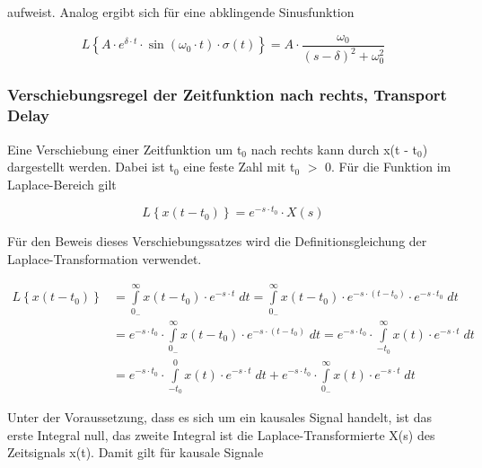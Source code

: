 \noindent aufweist. Analog ergibt sich für eine abklingende Sinusfunktion 

\begin{equation}\label{eq:fourthirtyfour}
L\left\{A\cdot e^{\delta \cdot t} \cdot \sin \left(\omega _{0} \cdot t\right)\cdot \sigma \left(t\right)\right\}=A\cdot \frac{\omega _{0} }{\left(s-\delta \right)^{2} +\omega _{0}^{2} }
\end{equation}

\subsubsection{Verschiebungsregel der Zeitfunktion nach rechts, Transport Delay}

\noindent Eine Verschiebung einer Zeitfunktion um t${}_{0}$ nach rechts kann durch x(t - t${}_{0}$) dargestellt werden. Dabei ist t${}_{0}$ eine feste Zahl mit t${}_{0}$ $\mathrm{>}$ 0. F\"{u}r die Funktion im Laplace-Bereich gilt

\begin{equation}\label{eq:fourthirtyfive}
L\left\{x\left(t-t_{0} \right)\right\}=e^{-s\cdot t_{0} } \cdot X\left(s\right)
\end{equation}

\noindent Für den Beweis dieses Verschiebungssatzes wird die Definitionsgleichung der Laplace-Transformation verwendet.

\begin{equation}\label{eq:fourthirtysix}
\begin{split}
L\left\{x\left(t-t_{0} \right)\right\} & = \int\limits _{0_{-} }^{\infty }x\left(t-t_{0} \right)\cdot e^{-s\cdot t}\;dt=\int\limits _{0_{-} }^{\infty }x\left(t-t_{0} \right)\cdot e^{-s\cdot (t-t_{0} )} \cdot e^{-s\cdot t_{0} } \;dt \\ 
& = e^{-s\cdot t_{0} } \cdot \int\limits _{0_{-} }^{\infty }x\left(t-t_{0} \right)\cdot e^{-s\cdot (t-t_{0} )}  \;dt=e^{-s\cdot t_{0} } \cdot \int\limits _{-t_{0} }^{\infty }x\left(t\right)\cdot e^{-s\cdot t}  \;dt \\ 
& = e^{-s\cdot t_{0} } \cdot \int\limits _{-t_{0} }^{0}x\left(t\right)\cdot e^{-s\cdot t} \; dt+e^{-s\cdot t_{0} } \cdot \int\limits _{0_{-} }^{\infty }x\left(t\right)\cdot e^{-s\cdot t}  \;dt
\end{split}
\end{equation}

\noindent Unter der Voraussetzung, dass es sich um ein kausales Signal handelt, ist das erste Integral null, das zweite Integral ist die Laplace-Transformierte X(s) des Zeitsignals x(t). Damit gilt für kausale Signale

